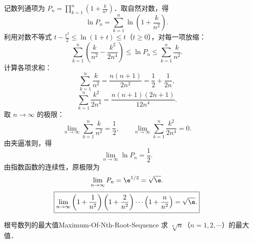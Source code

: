 \begin{solution}
    记数列通项为 $P_n = \prod_{k=1}^n \left( 1 + \frac{k}{n^2} \right)$．取自然对数，得
    \begin{equation}
        \ln P_n = \sum_{k=1}^n \ln\left( 1 + \frac{k}{n^2} \right).
    \end{equation}
    利用对数不等式 $t - \frac{t^2}{2} \leqslant \ln(1 + t) \leqslant t$（$t \geqslant 0$），对每一项放缩：
    \begin{equation}
        \sum_{k=1}^n \left( \frac{k}{n^2} - \frac{k^2}{2n^4} \right) \leqslant \ln P_n \leqslant \sum_{k=1}^n \frac{k}{n^2}.
    \end{equation}
    计算各项求和：
    \begin{equation}
        \sum_{k=1}^n \frac{k}{n^2} = \frac{n(n+1)}{2n^2} = \frac{1}{2} + \frac{1}{2n},
    \end{equation}
    \begin{equation}
        \sum_{k=1}^n \frac{k^2}{2n^4} = \frac{n(n+1)(2n+1)}{12n^4}.
    \end{equation}
    取 $n \to \infty$ 的极限：
    \begin{equation}
        \lim_{n\to\infty} \sum_{k=1}^n \frac{k}{n^2} = \frac{1}{2}, \qquad \lim_{n\to\infty} \sum_{k=1}^n \frac{k^2}{2n^4} = 0.
    \end{equation}
    由夹逼准则，得
    \begin{equation}
        \lim_{n\to\infty} \ln P_n = \frac{1}{2}.
    \end{equation}
    由指数函数的连续性，原极限为
    \begin{equation}
        \lim_{n\to\infty} P_n = \e^{1/2} = \sqrt{\e}.
    \end{equation}
    \begin{equation}
        \boxed{\lim_{n\to\infty} \left( 1 + \frac{1}{n^2} \right)\left( 1 + \frac{2}{n^2} \right)\cdots\left( 1 + \frac{n}{n^2} \right) = \sqrt{\e}.}
    \end{equation}
\end{solution}

\begin{problem}{根号数列的最大值}{Maximum-Of-Nth-Root-Sequence}
    求 $\sqrt[n]{n}$（$n = 1, 2, \cdots$）的最大值．
\end{problem}


